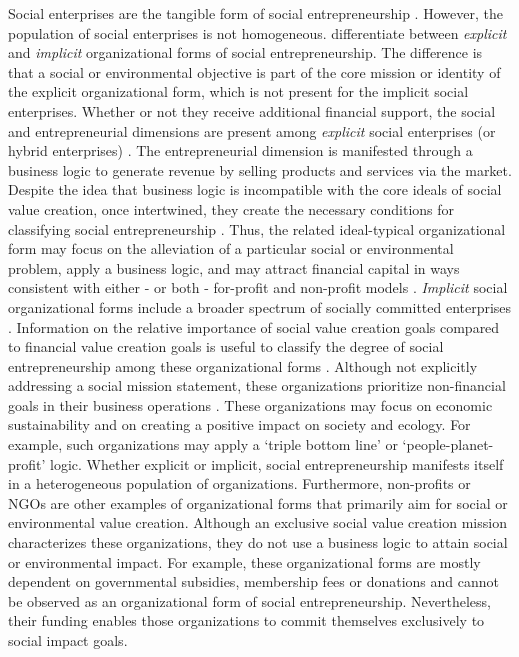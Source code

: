 \documentclass{article}
\begin{document}
Social enterprises are the tangible form of social entrepreneurship \parencite{Mair2006}. However, the population of social enterprises is not homogeneous. \parencite{Lepoutre2013} differentiate between \emph{explicit }and \emph{implicit} organizational forms of social entrepreneurship. The difference is that a social or environmental objective is part of the core mission or identity of the explicit organizational form, which is not present for the implicit social enterprises. Whether or not they receive additional financial support, the social and entrepreneurial dimensions are present among \emph{explicit }social enterprises (or hybrid enterprises) \parencite{Defourny2010}. The entrepreneurial dimension is manifested through a business logic \parencite[][at, ,least, ,to, ,some, ,extent, ,--see]{Lepoutre2013} to generate revenue by selling products and services via the market. Despite the idea that business logic is incompatible with the core ideals of social value creation, once intertwined, they create the necessary conditions for classifying social entrepreneurship \parencite{Defourny2010, Haigh2015, Weerawardena2006}. Thus, the related ideal-typical organizational form may focus on the alleviation of a particular social or environmental problem, apply a business logic, and may attract financial capital in ways consistent with either - or both - for-profit and non-profit models \parencite{Battilana2014, Lepoutre2013}. \emph{Implicit }social organizational forms include a broader spectrum of socially committed enterprises \parencite{Lepoutre2013}. Information on the relative importance of social value creation goals compared to financial value creation goals is useful to classify the degree of social entrepreneurship among these organizational forms \parencite{Bacq2016, Zahra2014}. Although not explicitly addressing a social mission statement, these organizations prioritize non-financial goals in their business operations \parencite{Lepoutre2013}. These organizations may focus on economic sustainability and on creating a positive impact on society and ecology.\emph{ }For example, such organizations may apply a ‘triple bottom line' or ‘people-planet-profit' logic. Whether explicit or implicit, social entrepreneurship manifests itself in a heterogeneous population of organizations. Furthermore, non-profits or NGOs are other examples of organizational forms that primarily aim for social or environmental value creation. Although an exclusive social value creation mission characterizes these organizations, they do not use a business logic to attain social or environmental impact. For example, these organizational forms are mostly dependent on governmental subsidies, membership fees or donations and cannot be observed as an organizational form of social entrepreneurship. Nevertheless, their funding enables those organizations to commit themselves exclusively to social impact goals. 
\end{document}
